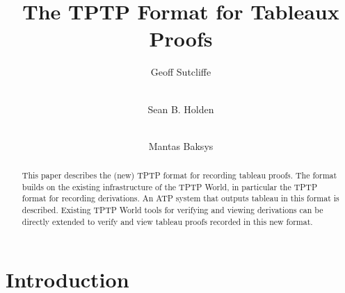 \documentclass[runningheads]{llncs}
\begin{document}
\title{The TPTP Format for Tableaux Proofs}

\author{
Geoff Sutcliffe\Envelope
\and
\\ Sean B. Holden
\and
\\ Mantas Baksys
}

\maketitle
\begin{abstract}
This paper describes the (new) TPTP format for recording tableau proofs.
The format builds on the existing infrastructure of the TPTP World, in particular the TPTP format
for recording derivations.
An ATP system that outputs tableau in this format is described.
Existing TPTP World tools for verifying and viewing derivations can be directly extended to
verify and view tableau proofs recorded in this new format.
\end{abstract}
\section{Introduction}
\label{Introduction}
\end{document}
